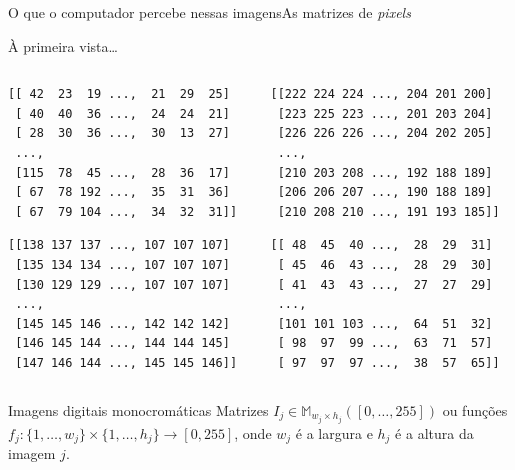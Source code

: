 \documentclass{beamer}
\begin{document}
    \begin{frame}[fragile]{O que o computador percebe nessas imagens}{As matrizes de \emph{pixels}}

        À primeira vista\ldots

        \begin{columns}
            \begin{column}{0.4\textwidth}
        {\tiny
        \begin{lstlisting}
[[ 42  23  19 ...,  21  29  25]
 [ 40  40  36 ...,  24  24  21]
 [ 28  30  36 ...,  30  13  27]
 ...,
 [115  78  45 ...,  28  36  17]
 [ 67  78 192 ...,  35  31  36]
 [ 67  79 104 ...,  34  32  31]]
        \end{lstlisting}}

        {\tiny
        \begin{lstlisting}
[[138 137 137 ..., 107 107 107]
 [135 134 134 ..., 107 107 107]
 [130 129 129 ..., 107 107 107]
 ..., 
 [145 145 146 ..., 142 142 142]
 [146 145 144 ..., 144 144 145]
 [147 146 144 ..., 145 145 146]]
        \end{lstlisting}}
            \end{column}
            \begin{column}{0.5\textwidth}

        {\tiny
        \begin{lstlisting}
[[222 224 224 ..., 204 201 200]
 [223 225 223 ..., 201 203 204]
 [226 226 226 ..., 204 202 205]
 ..., 
 [210 203 208 ..., 192 188 189]
 [206 206 207 ..., 190 188 189]
 [210 208 210 ..., 191 193 185]]
        \end{lstlisting}}

        {\tiny
        \begin{lstlisting}
[[ 48  45  40 ...,  28  29  31]
 [ 45  46  43 ...,  28  29  30]
 [ 41  43  43 ...,  27  27  29]
 ..., 
 [101 101 103 ...,  64  51  32]
 [ 98  97  99 ...,  63  71  57]
 [ 97  97  97 ...,  38  57  65]]
        \end{lstlisting}}

            \end{column}
        \end{columns}

        \pause

        \begin{block}{Imagens digitais monocromáticas}
            Matrizes $I_j \in \mathbb{M}_{w_j \times h_j}([0,\ldots,255])$
 ou funções $f_j:\{1,\ldots,w_j\} \times \{1,\ldots,h_j\} 
 \to [0,255]$, onde $w_j$ é a largura e $h_j$ é a altura da imagem $j$.
        \end{block}


    \end{frame}
    
\end{document}
